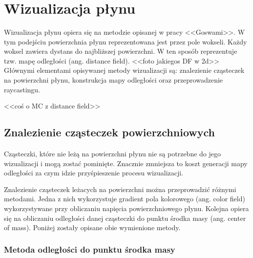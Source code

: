 \newpage

\section{Wizualizacja płynu}

\paragraph{}
Wizualizacja płynu opiera się na metodzie opisanej w pracy <<Goswami>>. W tym podejściu powierzchnia płynu reprezentowana jest przez pole wokseli. Każdy woksel zawiera dystans do najbliższej powierzchni. W ten sposób reprezentuje tzw. mapę odległości (ang. distance field). <<foto jakiegos DF w 2d>>
Głównymi elementami opisywanej metody wizualizacji są: znalezienie cząsteczek na powierzchni płynu, konstrukcja mapy odległości oraz przeprowadzenie raycastingu.
\par
<<coś o MC z distance field>>
\par

\subsection{Znalezienie cząsteczek powierzchniowych}

\paragraph{}
Cząsteczki, które nie leżą na powierzchni płynu nie są potrzebne do jego wizualizacji i mogą zostać pominięte. Znacznie zmniejsza to koszt generacji mapy odległości za czym idzie przyśpieszenie procesu wizualizacji.
\par
Znalezienie cząsteczek leżacych na powierzchni można przeprowadzić różnymi metodami. Jedna z nich wykorzystuje gradient pola kolorowego (ang. color field) wykorzystywane przy obliczaniu napięcia powierzchniowego płynu. Kolejna opiera się na obliczaniu odległości danej cząsteczki do punktu środka masy (ang. center of mass). Poniżej zostały opisane obie wymienione metody.

\subsubsection{Metoda odległości do punktu środka masy}

